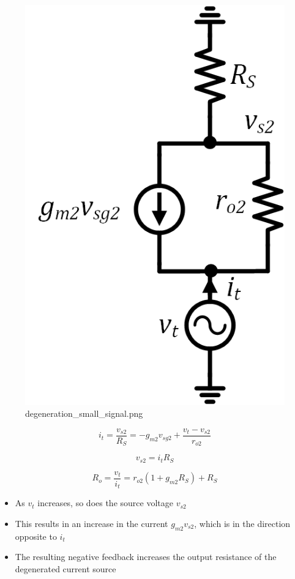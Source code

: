 \documentclass[11pt]{article}
\providecommand{\tightlist}{%
      \setlength{\itemsep}{0pt}\setlength{\parskip}{0pt}}
\begin{document}
    \begin{figure}
\centering
\includegraphics{degeneration_small_signal.png}
\caption{degeneration\_small\_signal.png}
\end{figure}

    \begin{equation}
i_t = \dfrac{v_{s2}}{R_S} = -g_{m2}v_{sg2} + \dfrac{v_t - v_{s2}}{r_{o2}}
\end{equation}

\begin{equation}
v_{s2} = i_t R_S
\end{equation}

\begin{equation}
\boxed{R_o = \dfrac{v_t}{i_t} = r_{o2}(1+g_{m2}R_S) + R_S}
\end{equation}

    \begin{itemize}
\tightlist
\item
  As \(v_t\) increases, so does the source voltage \(v_{s2}\)
\item
  This results in an increase in the current \(g_{m2}v_{s2}\), which is
  in the direction opposite to \(i_t\)
\item
  The resulting negative feedback increases the output resistance of the
  degenerated current source
\end{itemize}
\end{document}
